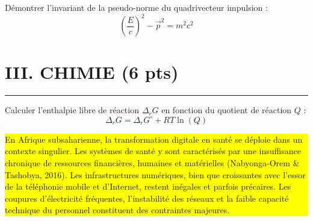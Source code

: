 \documentclass[12pt,a4paper]{article}
\begin{document}
Démontrer l’invariant de la pseudo-norme du quadrivecteur impulsion :
\[\left(\frac{E}{c}\right)^2 - \overrightarrow{p}^2 = m^2 c^2\]
	
\section*{III. CHIMIE (6 pts)}
\begin{center}
	\textcolor{green}{\rule{\linewidth}{1mm}}	 
\end{center}
	
Calculer l’enthalpie libre de réaction $\Delta_r G$ en fonction du quotient de réaction $Q$ :\[\Delta_r G = \Delta_r G^\circ + RT \ln(Q)\]
	
\vspace{0.5cm} 
\colorbox{yellow}{\parbox{\textwidth}{
En Afrique subsaharienne, la transformation digitale en santé se déploie dans un contexte singulier. Les systèmes de santé y sont caractérisés par une insuffisance chronique de ressources financières, humaines et matérielles (Nabyonga-Orem \& Tashobya, 2016). Les infrastructures numériques, bien que croissantes avec l’essor de la téléphonie mobile et d’Internet, restent inégales et parfois précaires. Les coupures d’électricité fréquentes, l’instabilité des réseaux et la faible capacité technique du personnel constituent des contraintes majeures.	}}
\end{document}
